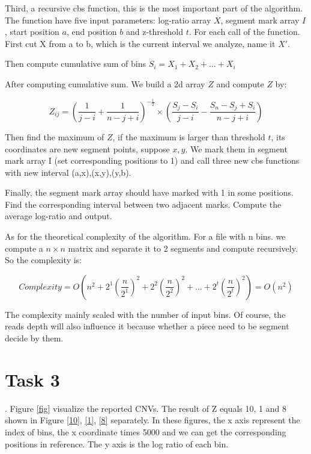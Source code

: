 \documentclass[a4paper]{article}
\begin{document}
Third, a recursive cbs function, this is the most important part of the algorithm. The function have five input parameters: log-ratio array $X$, segment mark array $I$, start position $a$, end position $b$ and z-threshold $t$. For each call of the function. First cut X from a to b, which is the current interval we analyze, name it $X'$. 

Then compute cumulative sum of bins $S_i = X_1+X_2+...+X_i$

After computing cumulative sum. We build a 2d array $Z$ and compute $Z$ by:

\begin{equation*}
Z_{ij}=(\frac{1}{j-i}+\frac{1}{n-j+i})^{-\frac{1}{2}}\times (\frac{S_j-S_i}{j-i}-\frac{S_n-S_j+S_i}{n-j+i})
\end{equation*}

Then find the maximum of $Z$, if the maximum is larger than threshold $t$, its coordinates are new segment points, suppose $x,y$. We mark them in segment mark array I (set corresponding positions to 1) and call three new cbs functions with new interval (a,x),(x,y),(y,b).

Finally, the segment mark array should have marked with 1 in some positions. Find the corresponding interval between two adjacent marks. Compute the average log-ratio and output.

As for the theoretical complexity of the algorithm. For a file with n bins. we compute a $n\times n$ matrix and separate it to 2 segments and compute recursively. So the complexity is:

\begin{equation*}
Complexity = O(n^2 + 2^{1}(\frac{n}{2^{1}})^2 + 2^{2}(\frac{n}{2^{2}})^2+...+2^{t}(\frac{n}{2^{t}})^2)=O(n^2)
\end{equation*}

The complexity mainly scaled with the number of input bins. Of course, the reads depth will also influence it because whether a piece need to be segment decide by them.

\section{Task 3}

. Figure \ref{fig} visualize the reported CNVs. The result of Z equals 10, 1 and 8 shown in Figure \ref{10}, \ref{1}, \ref{8} separately. In these figures, the x axis represent the index of bins, the x coordinate times 5000 and we can get the corresponding positions in reference. The y axis is the log ratio of each bin.
\end{document}
